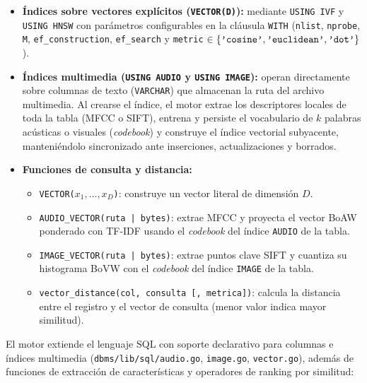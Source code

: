 \documentclass[11pt,a4paper]{article}
\begin{document}
\begin{itemize}
  \item \textbf{Índices sobre vectores explícitos (\texttt{VECTOR(D)}):} mediante \texttt{USING IVF} y \texttt{USING HNSW} con parámetros configurables en la cláusula \texttt{WITH} (\texttt{nlist}, \texttt{nprobe}, \texttt{M}, \texttt{ef\_construction}, \texttt{ef\_search} y \texttt{metric} $\in \{\text{\texttt{'cosine'}}, \text{\texttt{'euclidean'}}, \text{\texttt{'dot'}}\}$).
  \item \textbf{Índices multimedia (\texttt{USING AUDIO} y \texttt{USING IMAGE}):} operan directamente sobre columnas de texto (\texttt{VARCHAR}) que almacenan la ruta del archivo multimedia. Al crearse el índice, el motor extrae los descriptores locales de toda la tabla (MFCC o SIFT), entrena y persiste el vocabulario de $k$ palabras acústicas o visuales (\emph{codebook}) y construye el índice vectorial subyacente, manteniéndolo sincronizado ante inserciones, actualizaciones y borrados.
  \item \textbf{Funciones de consulta y distancia:}
  \begin{itemize}
    \item \texttt{VECTOR($x_1, \dots, x_D$)}: construye un vector literal de dimensión $D$.
    \item \texttt{AUDIO\_VECTOR(ruta | bytes)}: extrae MFCC y proyecta el vector BoAW ponderado con TF-IDF usando el \emph{codebook} del índice \texttt{AUDIO} de la tabla.
    \item \texttt{IMAGE\_VECTOR(ruta | bytes)}: extrae puntos clave SIFT y cuantiza su histograma BoVW con el \emph{codebook} del índice \texttt{IMAGE} de la tabla.
    \item \texttt{vector\_distance(col, consulta [, metrica])}: calcula la distancia entre el registro y el vector de consulta (menor valor indica mayor similitud).
  \end{itemize}
\end{itemize}

El motor extiende el lenguaje SQL con soporte declarativo para columnas e índices multimedia (\texttt{dbms/lib/sql/audio.go}, \texttt{image.go}, \texttt{vector.go}), además de funciones de extracción de características y operadores de ranking por similitud:
\end{document}
